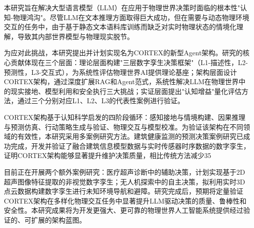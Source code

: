 
本研究旨在解决大型语言模型（LLM）在应用于物理世界决策时面临的根本性"认知-物理鸿沟"。尽管LLM在文本推理方面取得巨大成功，但在需要与动态物理环境交互的任务中，由于基于静态文本语料库训练而缺乏对实时物理状态的情境化理解，导致其内部世界模型与物理现实脱节。

为应对此挑战，本研究提出并计划实现名为CORTEX的新型Agent架构。研究的核心贡献体现在三个层面：理论层面构建"三层数字孪生决策框架"（L1-描述性，L2-预测性，L3-交互式），为系统性评估物理世界AI提供理论基座；架构层面设计CORTEX架构，通过深度扩展RAG和Agent范式，系统性解决LLM在物理世界中的现实接地、模型利用和安全执行三大挑战；实证层面提出"认知增益"量化评估方法，通过三个分别对应L1、L2、L3的代表性案例进行验证。

CORTEX架构基于认知科学启发的四阶段循环：感知接地与情境构建、因果推理与预测仿真、行动策略生成与验证、物理交互与模型校准。为验证该架构在不同领域的有效性，本研究采用多案例研究方法。建筑健康监测的预测决策案例研究已成功完成，开发并验证了融合建筑信息模型数据与实时传感器时序数据的数字孪生，证明CORTEX架构能够显著提升维护决策质量，相比传统方法减少35%

目前正在开展两个额外案例研究：医疗超声诊断中的辅助决策，计划实现基于2D超声图像特征提取的非视觉数字孪生；无人机探索中的自主决策，拟利用实时3D点云数据构建数字孪生进行未知环境导航和避障。研究完成后，预期将定量验证CORTEX架构在多样化物理交互任务中显著提升LLM驱动决策的质量、鲁棒性和安全性。本研究成果将为开发更强大、更可靠的物理世界人工智能系统提供经过验证的、可扩展的架构蓝图。